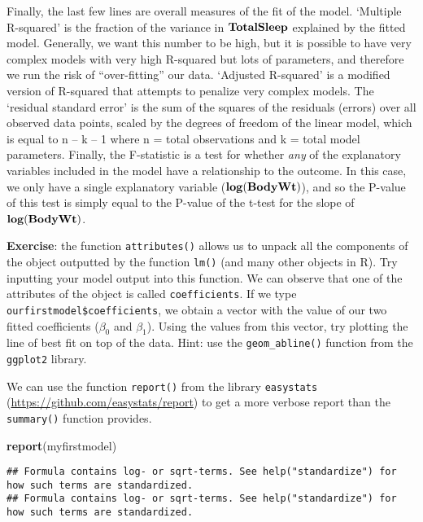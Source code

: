 \documentclass[
]{book}
\newenvironment{Shaded}{\begin{snugshade}}{\end{snugshade}}
\newcommand{\KeywordTok}[1]{\textcolor[rgb]{0.13,0.29,0.53}{\textbf{#1}}}
\newcommand{\NormalTok}[1]{#1}
\begin{document}
Finally, the last few lines are overall measures of the fit of the model. `Multiple R-squared' is the fraction of the variance in \(\bf{TotalSleep}\) explained by the fitted model. Generally, we want this number to be high, but it is possible to have very complex models with very high R-squared but lots of parameters, and therefore we run the risk of ``over-fitting'' our data. `Adjusted R-squared' is a modified version of R-squared that attempts to penalize very complex models. The `residual standard error' is the sum of the squares of the residuals (errors) over all observed data points, scaled by the degrees of freedom of the linear model, which is equal to n -- k -- 1 where n = total observations and k = total model parameters. Finally, the F-statistic is a test for whether \emph{any} of the explanatory variables included in the model have a relationship to the outcome. In this case, we only have a single explanatory variable (\(\bf{log(BodyWt)}\)), and so the P-value of this test is simply equal to the P-value of the t-test for the slope of \(\bf{log(BodyWt)}\).

\textbf{Exercise}: the function \texttt{attributes()} allows us to unpack all the components of the object outputted by the function \texttt{lm()} (and many other objects in R). Try inputting your model output into this function. We can observe that one of the attributes of the object is called \texttt{coefficients}. If we type \texttt{ourfirstmodel\$coefficients}, we obtain a vector with the value of our two fitted coefficients (\(\beta_0\) and \(\beta_1\)). Using the values from this vector, try plotting the line of best fit on top of the data. Hint: use the \texttt{geom\_abline()} function from the \texttt{ggplot2} library.

We can use the function \texttt{report()} from the library \texttt{easystats} (\url{https://github.com/easystats/report}) to get a more verbose report than the \texttt{summary()} function provides.

\begin{Shaded}
\begin{Highlighting}[]
\KeywordTok{report}\NormalTok{(myfirstmodel)}
\end{Highlighting}
\end{Shaded}

\begin{verbatim}
## Formula contains log- or sqrt-terms. See help("standardize") for how such terms are standardized.
## Formula contains log- or sqrt-terms. See help("standardize") for how such terms are standardized.
\end{verbatim}
\end{document}

